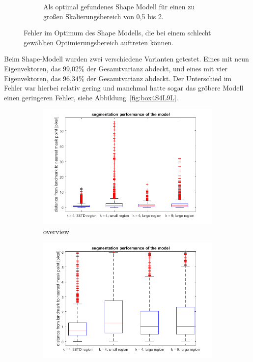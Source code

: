 \documentclass[]{report}
\begin{document}
\begin{enumerate}
\begin{enumerate}
\begin{figure}
\begin{subfigure}[t]{0.3\textwidth}
						\caption{Als optimal gefundenes Shape Modell für einen zu großen Skalierungsbereich von 0,5 bis 2.}
						\label{fig:image31_wrongScalingRange}
					\end{subfigure}
				\caption{Fehler im Optimum des Shape Modells, die bei einem schlecht gewählten Optimierungsbereich auftreten können.}	
				\end{figure}
				Beim Shape-Modell wurden zwei verschiedene Varianten getestet. Eines mit neun Eigenvektoren, das 99,02\% der Gesamtvarianz abdeckt, und eines mit vier Eigenvektoren, das 96,34\% der Gesamtvarianz abdeckt. Der Unterschied im Fehler war hierbei relativ gering und manchmal hatte sogar das gröbere Modell einen geringeren Fehler, siehe Abbildung~\ref{fig:box4S4L9L}.\\ 
				\begin{figure}
					\begin{subfigure}[t]{0.48\textwidth}
						\centering
						\includegraphics[width=\textwidth]{figures/box_4STD_4S_4L_9L.png}
						\caption{overview}
					\end{subfigure}
					\quad
					\begin{subfigure}[t]{0.48\textwidth}
						\centering
						\includegraphics[width=\textwidth]{figures/box_4STD_4S_4L_9L_zoomed.png}

\end{subfigure}
\end{figure}
\end{enumerate}
\end{enumerate}
\end{document}
